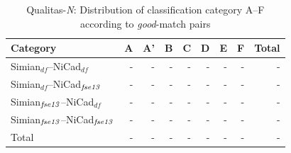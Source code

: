 \documentclass{IEEEtran}
\begin{document}

\begin{table}[H]
	\centering
	\caption{Qualitas-\textit{N}: Distribution of classification category A--F according to \textit{good}-match pairs}
	\label{tab:good_classification}
	\begin{tabular}{|l|r|r|r|r|r|r|r|r|}
		\hline 
		Category   & A   & 	A'   & 	B   & C   & D   &	E   &	F   & Total  \\
		\hline
		Simian$_{df}$--NiCad$_{df}$   & - & - & - & - & - & - & - & - \\
		Simian$_{df}$--NiCad$_{\textrm{\textit{fse13}}}$   & - & - & - & - & - & - & - & - \\
		Simian$_{\textrm{\textit{fse13}}}$--NiCad$_{df}$   & - & - & - & - & - & - & - & - \\
		Simian$_{\textrm{\textit{fse13}}}$--NiCad$_{\textrm{\textit{fse13}}}$ & - & - & - & - & - & - & - & - \\
		\hline
		Total & - & - & - & - & - & - & - & - \\
		\hline
	\end{tabular} 
\end{table}
\end{document}

